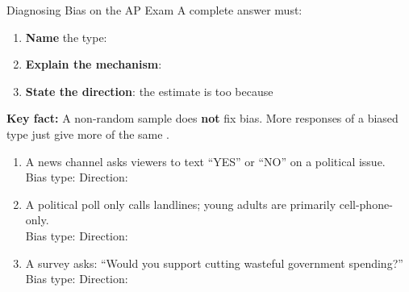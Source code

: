\documentclass[10pt]{article}
\begin{document}
\vspace{0.1in}

\begin{notesbox}{Diagnosing Bias on the AP Exam}
\small
A complete answer must:
\begin{enumerate}[itemsep=4pt]
  \item \textbf{Name} the type: 
  \item \textbf{Explain the mechanism}: 
  \item \textbf{State the direction}: the estimate is too  because 
\end{enumerate}

\vspace{8pt}
\textbf{Key fact:} A  non-random sample does \textbf{not} fix bias.
More responses of a biased type just give more of the same .
\end{notesbox}

\vspace{0.1in}

\begin{practicebox}
\small
\begin{enumerate}[leftmargin=1.5em, itemsep=10pt]
  \item A news channel asks viewers to text ``YES'' or ``NO'' on a political issue.\\
        Bias type:  \quad Direction: 

  \item A political poll only calls landlines; young adults are primarily cell-phone-only.\\
        Bias type:  \quad Direction: 

  \item A survey asks: ``Would you support cutting wasteful government spending?''\\
        Bias type:  \quad Direction: 
\end{enumerate}
\end{practicebox}
\end{document}
